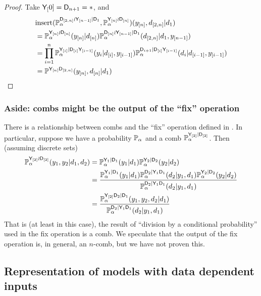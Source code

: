 \begin{proof}
Take $\mathsf{Y}_[0]=\mathsf{D}_{n+1}=*$, and
\begin{align}
    &\mathrm{insert}(\mathbb{P}_\alpha^{\mathsf{D}_{[2,n]}\wr \mathsf{Y}_{[n-1]}|\mathsf{D}_1},\mathbb{P}_\alpha^{\mathsf{Y}_{[n]}\wr \mathsf{D}_{[n]}})(y_{[n]},d_{[2,n]}|d_1)\\
     &= \mathbb{P}_\alpha^{\mathsf{Y}_{[n]}\wr \mathsf{D}_{[n]}}(y_{[n]}|d_{[n]})\mathbb{P}_\alpha^{\mathsf{D}_{[n]}\wr\mathsf{Y}_{[n-1]}|\mathsf{D}_1}(d_{[2,n]}|d_1,y_{[n-1]})\\
    &= \prod_{i=1}^n \mathbb{P}_\alpha^{\mathsf{Y}_{[i]}|\mathsf{D}_{[i]}\mathsf{Y}_{[i-1]}}(y_i|d_{[i]},y_{[i-1]})\mathbb{P}_\alpha^{\mathsf{D}_{i+1}|\mathsf{D}_{[i]}\mathsf{Y}_{[i-1]}}(d_i|d_{[i-1]},y_{[i-1]})\\
    &= \mathbb{P}^{\mathsf{Y}_{[n]}\mathsf{D}_{[2,n]}}(y_{[n]},d_{[n]}|d_1)
\end{align}
    
\end{proof}

\subsubsection{Aside: combs might be the output of the ``fix'' operation}

There is a relationship between combs and the ``fix'' operation defined in \citet{richardson_nested_2017}. In particular, suppose we have a probability $\mathbb{P}_\alpha$ and a comb $\mathbb{P}_\alpha^{\mathsf{Y}_{[2]}|\mathsf{D}_{[2]}}$. Then (assuming discrete sets)
\begin{align}
    \mathbb{P}_\alpha^{\mathsf{Y}_{[2]}\wr \mathsf{D}_{[2]}}(y_1,y_2|d_1,d_2) &= \mathbb{P}_\alpha^{\mathsf{Y}_1|\mathsf{D}_1}(y_1|d_1)\mathbb{P}_\alpha^{\mathsf{Y}_2|\mathsf{D}_2}(y_2|d_2)\\
    &= \frac{\mathbb{P}_\alpha^{\mathsf{Y}_1|\mathsf{D}_1}(y_1|d_1)\mathbb{P}_\alpha^{\mathsf{D}_2|\mathsf{Y}_1\mathsf{D}_1}(d_2|y_1,d_1)\mathbb{P}_\alpha^{\mathsf{Y}_2|\mathsf{D}_2}(y_2|d_2)}{\mathbb{P}_\alpha^{\mathsf{D}_2|\mathsf{Y}_1\mathsf{D}_1}(d_2|y_1,d_1)}\\
    &= \frac{\mathbb{P}_\alpha^{\mathsf{Y}_{[2]}\mathsf{D}_2|\mathsf{D}_1}(y_1,y_2,d_2|d_1)}{\mathbb{P}_\alpha^{\mathsf{D}_2|\mathsf{Y}_1\mathsf{D}_1}(d_2|y_1,d_1)}
\end{align}
That is (at least in this case), the result of ``division by a conditional probability'' used in the fix operation is a comb. We speculate that the output of the fix operation is, in general, an $n$-comb, but we have not proven this.


\subsection[Representation of data-dependent inputs]{Representation of models with data dependent inputs}\label{sec:data_dependent_representation}

